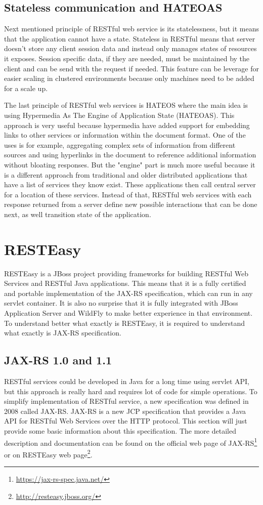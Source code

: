 \documentclass[12pt,final,oneside]{fithesis2}
\begin{document}
\subsection*{Stateless communication and HATEOAS}
Next mentioned principle of RESTful web service is its statelessness, but it means that the application cannot have a state. Stateless in RESTful means that server doesn't store any client session data and instead only manages states of resources it exposes. Session specific data, if they are needed, must be maintained by the client and can be send with the request if needed. This feature can be leverage for easier scaling in clustered environments because only machines need to be added for a scale up. 

The last principle of RESTful web services is HATEOS where the main idea is using Hypermedia As The Engine of Application State (HATEOAS). This approach is very useful because hypermedia have added support for embedding links to other services or information within the document format. One of the uses is for example, aggregating complex sets of information from different sources and using hyperlinks in the document to reference additional information without bloating responses. But the "engine" part is much more useful because it is a different approach from traditional and older distributed applications that have a list of services they know exist. These applications then call central server for a location of these services. Instead of that, RESTful web services with each response returned from a server define new possible interactions that can be done next, as well transition state of the application.

\section{RESTEasy}
RESTEasy is a JBoss project providing frameworks for building RESTful Web Services and RESTful Java applications. This means that it is a fully certified and portable implementation of the JAX-RS specification, which can run in any servlet container. It is also no surprise that it is fully integrated with JBoss Application Server and WildFly to make better experience in that environment. To understand better what exactly is RESTEasy, it is required to understand what exactly is JAX-RS specification.\cite{resteasy-doc}

 
\subsection{JAX-RS 1.0 and 1.1}
RESTful services could be developed in Java for a long time using servlet API, but this approach is really hard and requires lot of code for simple operations. To simplify implementation of RESTful service, a new specification was defined in 2008 called JAX-RS. JAX-RS is a new JCP specification that provides a Java API for RESTful Web Services over the HTTP protocol. This section will just provide some basic information about this specification. The more detailed description and documentation can be found on the official web page of JAX-RS\footnote{\url{https://jax-rs-spec.java.net/}} or on RESTEasy web page\footnote{\url{http://resteasy.jboss.org/}}. 
\end{document}
